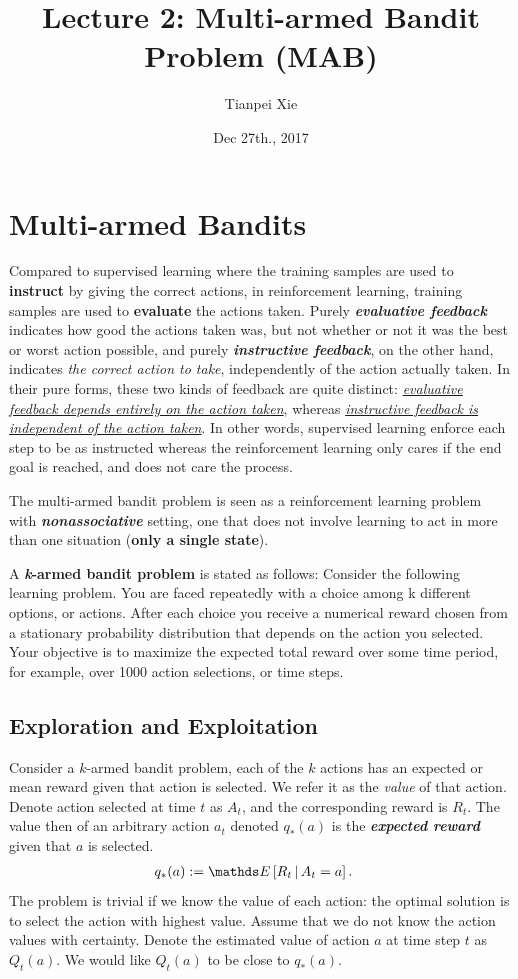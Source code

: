 \documentclass[11pt]{article}
\begin{document}
\title{Lecture 2: Multi-armed Bandit Problem (MAB)}
\author{ Tianpei Xie}
\date{ Dec 27th., 2017 }
\maketitle
\tableofcontents
\newpage
\section{Multi-armed Bandits}
Compared to supervised learning where the training samples are used to \textbf{instruct} by giving the correct actions, in reinforcement learning, training samples are used to \textbf{evaluate} the actions taken. Purely \emph{\textbf{evaluative feedback}} indicates how good the actions taken was, but not whether or not it was the best or worst action possible, and purely \emph{\textbf{instructive feedback}}, on the other hand, indicates \emph{the correct action to take}, independently of the action actually taken. In their pure forms, these two kinds of feedback are quite distinct: \emph{\underline{evaluative feedback depends entirely on the action taken}}, whereas \emph{\underline{instructive feedback is independent of the action taken}}. In other words, supervised learning enforce each step to be as instructed whereas the reinforcement learning only cares if the end goal is reached, and does not care the process. 

The multi-armed bandit problem is seen as  a reinforcement learning problem with \emph{\textbf{nonassociative}} setting, one that does not involve learning to act in more than one situation (\textbf{only a single state}). 

A\textbf{ \emph{k}-armed bandit problem} is stated as follows:  Consider the following learning problem. You are faced repeatedly with a choice among k different options,
or actions. After each choice you receive a numerical reward chosen from a stationary probability distribution that depends on the action you selected. Your objective is to maximize the expected total reward over some time period, for example, over 1000 action selections, or time steps.

\subsection{Exploration and Exploitation}
Consider a $k$-armed bandit problem, each of the $k$ actions has an expected or mean reward given that action is selected. We refer it as the \emph{value} of that action. Denote action selected at time $t$ as $A_t$, and the corresponding reward is $R_t$. The value then of an arbitrary action $a_t$  denoted $q_{*}(a)$ is the \emph{\textbf{expected reward}} given that $a$ is selected.  
\begin{align*}
q_*(a) &:= \E{}{R_t \,|\, A_t = a}.
\end{align*} The problem is trivial if we know the value of each action: the optimal  solution is to select the action with highest value.  Assume that we do not know the action values with certainty. Denote the estimated value of action $a$ at time step $t$ as $Q_t(a)$. We would like $Q_t(a)$ to be close to $q_*(a)$. 
\end{document}
